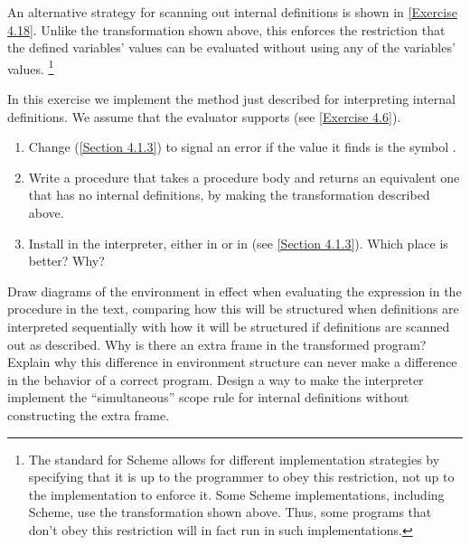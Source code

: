An alternative strategy for scanning out internal definitions is shown in \cref{Exercise 4.18}.
Unlike the transformation shown above, this enforces the restriction that the defined variables’ values can be evaluated without using any of the variables’ values.%
\footnote{
	The  standard for Scheme allows for different implementation strategies by specifying that it is up to the programmer to obey this restriction, not up to the implementation to enforce it.
	Some Scheme implementations, including  Scheme, use the transformation shown above.
	Thus, some programs that don’t obey this restriction will in fact run in such implementations.
}



\begin{exercise}
	\label{Exercise 4.16}
	In this exercise we implement the method just described for interpreting internal definitions.
	We assume that the evaluator supports  (see \cref{Exercise 4.6}).
	\begin{enumerate}[label = \alph*., leftmargin = *]

		\item
			Change  (\cref{Section 4.1.3}) to signal an error if the value it finds is the symbol .

		\item
			Write a procedure  that takes a procedure body and returns an equivalent one that has no internal definitions, by making the transformation described above.

		\item
			Install  in the interpreter, either in  or in  (see \cref{Section 4.1.3}).
			Which place is better?
			Why?

	\end{enumerate}
\end{exercise}



\begin{exercise}
	\label{Exercise 4.17}
	Draw diagrams of the environment in effect when evaluating the expression  in the procedure in the text, comparing how this will be structured when definitions are interpreted sequentially with how it will be structured if definitions are scanned out as described.
	Why is there an extra frame in the transformed program?
	Explain why this difference in environment structure can never make a difference in the behavior of a correct program.
	Design a way to make the interpreter implement the “simultaneous” scope rule for internal definitions without constructing the extra frame.
\end{exercise}



